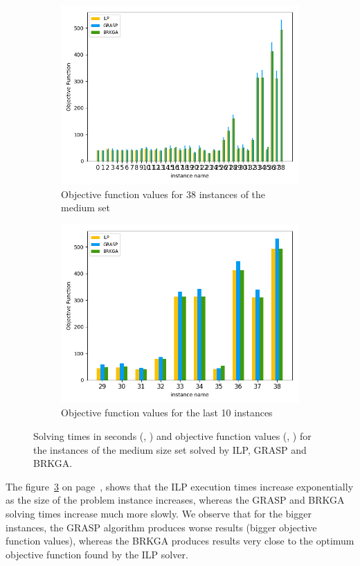 \begin{figure}[h!]
\begin{subfigure}[b]{.49\linewidth}
\centering
\includegraphics[width=\linewidth]{./img/ILPvsMetah_objf_hist.png}
\caption{Objective function values for 38 instances of the medium set }\label{fig1c}
\end{subfigure}
\begin{subfigure}[b]{.49\linewidth}
\centering
\includegraphics[width=\linewidth]{./img/ILPvsMetah_objf_hist_last10.png}
\caption{Objective function values for the last 10 instances  }\label{fig1d}
\end{subfigure}
\caption{Solving times in seconds (, ) and objective function values (, ) for the instances of the medium size set solved by ILP, GRASP and BRKGA.  }
\label{fig_ilp_vs_meta}
\end{figure}


The figure~\ref{fig_ilp_vs_meta} on page~\pageref{fig_ilp_vs_meta}, shows that the ILP execution times increase exponentially as the size of the problem instance increases, whereas the GRASP and BRKGA solving times increase much more slowly.
We observe that for the bigger instances, the GRASP algorithm produces worse results (bigger objective function values), whereas the BRKGA produces results very close to the optimum objective function found by the ILP solver.

\pagebreak